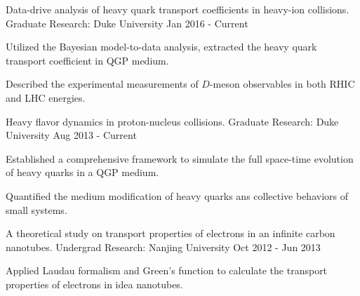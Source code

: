

\begin{cventries}
  \cvexperience
    {Data-drive analysis of heavy quark transport coefficients in heavy-ion collisions.} %
    {Graduate Research: } %
    {Duke University} %
    {Jan 2016 - Current} %
    {
      \begin{cvitems} %
      	\item {Utilized the Bayesian model-to-data analysis, extracted the heavy quark transport coefficient in QGP medium.}
      	\item {Described the experimental measurements of $D$-meson observables in both RHIC and LHC energies.}
      \end{cvitems}
    }

  \cvexperience
    {Heavy flavor dynamics in proton-nucleus collisions.} %
    {Graduate Research: } %
    {Duke University} %
    {Aug 2013 - Current} %
    {
      \begin{cvitems} %
      	\item {Established a comprehensive framework to simulate the full space-time evolution of heavy quarks in a QGP medium.}
      	\item {Quantified the medium modification of heavy quarks ans collective behaviors of small systems.}
      \end{cvitems}
    } 
    

  \cvexperience
    {A theoretical study on transport properties of electrons in an infinite carbon nanotubes.} %
    {Undergrad Research: } %
    {Nanjing University} %
    {Oct 2012 - Jun 2013} %
    {
      \begin{cvitems} %
      	\item {Applied Laudau formalism and Green's function to calculate the transport properties of electrons in idea nanotubes.}
      \end{cvitems}
    } 


\end{cventries}
